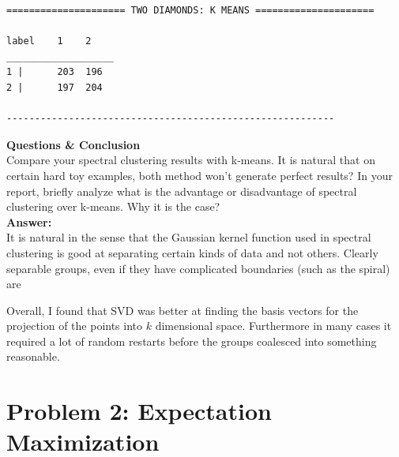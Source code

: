 \documentclass[11pt]{article}
\begin{document}
\begin{verbatim}
===================== TWO DIAMONDS: K MEANS =====================

label    1    2    
___________________
1 |      203  196    
2 |      197  204    

----------------------------------------------------------
\end{verbatim}
\textbf{Questions \& Conclusion}
\\[5pt]
Compare your spectral clustering results with k-means. It is natural that on certain hard toy examples, both method won't generate perfect results? In your report, briefly analyze what is the advantage or disadvantage of spectral clustering over k-means. Why it is the case? 
\\[5pt]\textbf{Answer:}\\[5pt]
It is natural in the sense that the Gaussian kernel function used in spectral clustering is good at separating certain kinds of data and not others. Clearly separable groups, even if they have complicated boundaries (such as the spiral) are

Overall, I found that SVD was better at finding the basis vectors for the projection of the points into $k$ dimensional space. Furthermore in many cases it required a lot of random restarts before the groups coalesced into something reasonable. 
\section*{Problem 2: Expectation Maximization}
\end{document}
